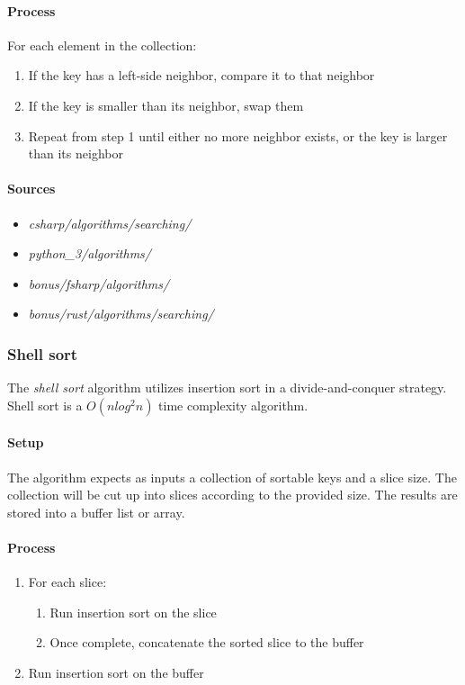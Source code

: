\documentclass{article}
\begin{document}
\paragraph{Process}
For each element in the collection:
\begin{enumerate}
\item{If the key has a left-side neighbor, compare it to that neighbor}
\item{If the key is smaller than its neighbor, swap them}
\item{Repeat from step 1 until either no more neighbor exists, or the key is larger than its neighbor}
\end{enumerate}

\begin{samepage}
  \paragraph{Sources}
  \begin{itemize}
  \item{{\em csharp/algorithms/searching/}}
  \item{{\em python\_3/algorithms/}}
  \item{{\em bonus/fsharp/algorithms/}}
  \item{{\em bonus/rust/algorithms/searching/}}
  \end{itemize}
\end{samepage}

\subsubsection{Shell sort}
The {\em shell sort} algorithm utilizes insertion sort in a divide-and-conquer strategy.
Shell sort is a \(O(n log^2 n)\) time complexity algorithm.

\paragraph{Setup}
The algorithm expects as inputs a collection of sortable keys and a slice size. The collection will be cut up into
slices according to the provided size. The results are stored into a buffer list or array.

\paragraph{Process}
\begin{enumerate}
\item{For each slice:}
  \begin{enumerate}
  \item{Run insertion sort on the slice}
  \item{Once complete, concatenate the sorted slice to the buffer}
  \end{enumerate}
\item{Run insertion sort on the buffer}
\end{enumerate}
\end{document}
